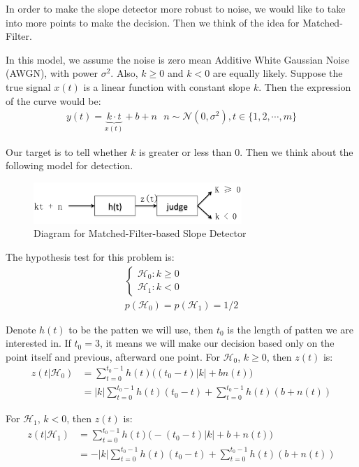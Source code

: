 \documentclass[journal]{IEEEtran}
\begin{document}
In order to make the slope detector more robust to noise, we would like to take into more points to make the decision. Then we think of the idea for Matched-Filter\cite{gubner2006probability}.

In this model, we assume the noise is zero mean Additive White Gaussian Noise (AWGN), with power $\sigma^2$. Also, $k \geq 0$ and $k < 0$ are equally likely.
Suppose the true signal $x(t)$ is a linear function with constant slope $k$. Then the expression of the curve would be:
\begin{align}
	y(t) = \underbrace{k \cdot t}_{x(t)} + b + n ~~~ n \sim \mathcal{N}(0, \sigma^2), t \in \{1, 2, \cdots, m\}
\end{align}

Our target is to tell whether $k$ is greater or less than $0$. Then we think about the following model for detection.
\begin{figure}
	\centering
	\includegraphics[width = 3.1in]{figure/MF_detector_diagram.png}
	\caption{Diagram for Matched-Filter-based Slope Detector}
	\label{Diagram for Matched-Filter-based Slope Detector}
\end{figure}
The hypothesis test for this problem is:
\begin{align*}
	\begin{cases}
		\mathcal{H}_0: k \geq 0\\
		\mathcal{H}_1: k < 0
	\end{cases}\\
	p(\mathcal{H}_0) = p(\mathcal{H}_1) = 1/2
\end{align*}

Denote $h(t)$ to be the patten we will use, then $t_0$ is the length of patten we are interested in. If $t_0 = 3$, it means we will make our decision based only on the point itself and previous, afterward one point.
For $\mathcal{H}_0$, $k \geq 0$, then $z(t)$ is:
\begin{align}
	z(t | \mathcal{H}_0) &= \sum_{t = 0} ^ {t_0 - 1} h(t)\big((t_0 - t) |k| + b n(t)\big)\\
		 &= |k|\sum_{t = 0} ^ {t_0 - 1} h(t)(t_0 - t) + \sum_{t = 0} ^ {t_0 - 1} h(t) (b + n(t)) \label{eq:H0 output of h(t)}
\end{align}

For $\mathcal{H}_1$, $k < 0$, then $z(t)$ is:
\begin{align}
	z(t | \mathcal{H}_1) &= \sum_{t = 0} ^ {t_0 - 1} h(t)\big(-(t_0 - t) |k| + b + n(t)\big)\\
		 &= -|k|\sum_{t = 0} ^ {t_0 - 1} h(t)(t_0 - t) + \sum_{t = 0} ^ {t_0 - 1} h(t) (b + n(t))\label{eq:H1 output of h(t)}
\end{align}
\end{document}
